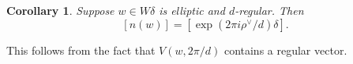 \documentclass[10pt,leqno]{article}
\newtheorem{corollary}[equation]{Corollary}
\renewcommand{\a}{\mathfrak a}
\newcommand{\ch}[1]{#1^\vee}
\def\a{\alpha}
\def\G{\Gamma}
\def\d{\delta}
\begin{document}
\begin{corollary}
Suppose $w\in W\delta$ is elliptic and $d$-regular. Then
$$
[n(w)]=[\exp(2\pi i\ch\rho/d)\delta].
$$
\end{corollary}

This follows from the fact that $V(w,2\pi/d)$ contains a regular vector.

\begin{comment}
This follows from the fact that the sequence consisting of a singleton
$(2\pi/d)$ is admissible in the sense of
\cite{he_nie_minimal_finite}*{\S 5.2}, see Remark
\ref{r:full}.
\end{comment}

\begin{comment}
\subsection{Example}\label{eg:regular}
Let $W$ be of type $E_6$ and let $\d$ be the unique nontrivial
automorphism of $(W, \Pi)$. Up to $W$-conjugation, there is a unique
3-regular element $w \in W \d$ of order 6, whose characteristic
polynomial is $\Phi_6 \Phi_3^2$, see \cite{springer_regular}*{Table
  8}. Note that $w$ is regular, but not $\mathbb Z$-regular. Moreover,
$\G_w=\{2\pi/6, 2\pi/3\}$ and the associated filtration is
$0 \subsetneqq F_1 = V(w,\frac{2\pi}{6}) \subsetneqq V$. Let
$\Delta_1 = \{\a \in \Delta; \langle\alpha, F_1\rangle = 0\}$.

Notice that $w^3 \in W\d$ is 1-regular and $\dim V^{w^3}=4$. On the other hand, $\d$ is also 1-regular and $\dim V^\d=4$. So $w^3$ is conjugate to $\d$ by
\cite{springer_regular}*{Theorem 6.4 (iv)}. In particular, $V(w, \frac{2\pi}{6})$ is conjugate to  $V(\d, \pi)$.

The simple roots of $E_6$ are labeled as follows.

$$
\begin{dynkinDiagram}[Kac,label,ordering=Bourbaki,root radius=.12cm, edge  length=1.0cm]{E}{6}
\end{dynkinDiagram}
$$
\medskip

The $\d$-orbits on $\Pi$ are $\{1, 6\}$, $\{3, 5\}$, $\{2\}$ and $\{4\}$. So $V(\d, \pi)$ is spanned by $(1, 0, 0, 0, 0, -1)$ and $(0, 0, 1, 0, -1, 0)$. Here $\mu=(\mu_1, \dots, \mu_6) \in \mathbb Z^6$ stands for the vector $\sum_{i=1}^6 \mu_i \a_i^\vee \in \mathbb Z \Delta^\vee$. One checks that the root system $\Delta' = \{\a \in \Delta; \langle \a, V(\d, \pi)\rangle=0\}$ is of type $D_4$, which is conjugate to the root system $\Delta''$ spanned by $\{2, 3, 4, 5\} \subseteq \Pi$. Up to $W$-conjugation, we can assume $\Delta_1 = \Delta''$.


\end{comment}
\end{document}
